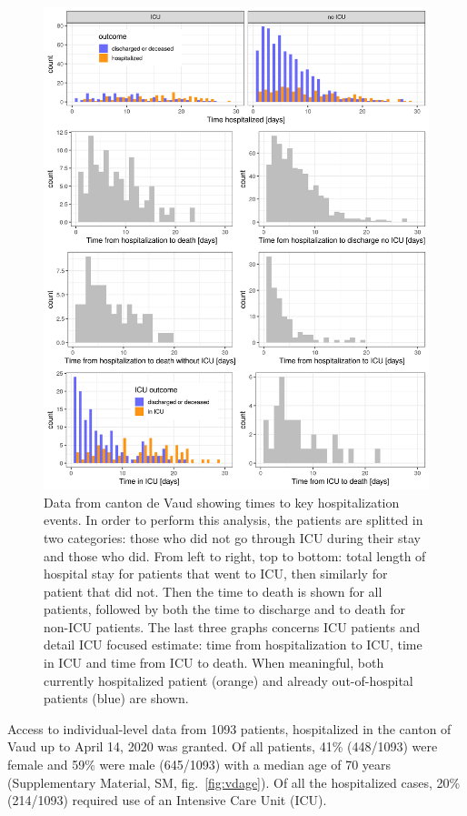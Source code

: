 {\begin{figure}[!htb]
    \includegraphics{fig_covid-switzerland-npi/fig_supp/VD_times.png}
    \caption[Key data of hospitalization events in canton de Vaud]{Data from canton de Vaud showing times to key hospitalization events. In order to perform this analysis, the patients are splitted in two categories: those who did not go through ICU during their stay and those who did. From left to right, top to bottom: total length of hospital stay for patients that went to ICU, then similarly for patient that did not. Then the time to death is shown for all patients, followed by both the time to discharge and to death for non-ICU patients. The last three graphs concerns ICU patients and detail ICU focused estimate: time from hospitalization to ICU, time in ICU and time from ICU to death. When meaningful, both currently hospitalized patient (orange) and already out-of-hospital patients (blue) are shown.}
    \label{fig:vdtimes}
\end{figure}


Access to individual-level data from 1093 patients, hospitalized in the canton of Vaud up to April 14, 2020 was granted. Of all patients, 41\% (448/1093) were female and 59\% were male (645/1093) with a median age of 70 years (Supplementary Material, SM, fig.~\ref{fig:vdage}). Of all the hospitalized cases, 20\% (214/1093) required use of an Intensive Care Unit (ICU).


}
